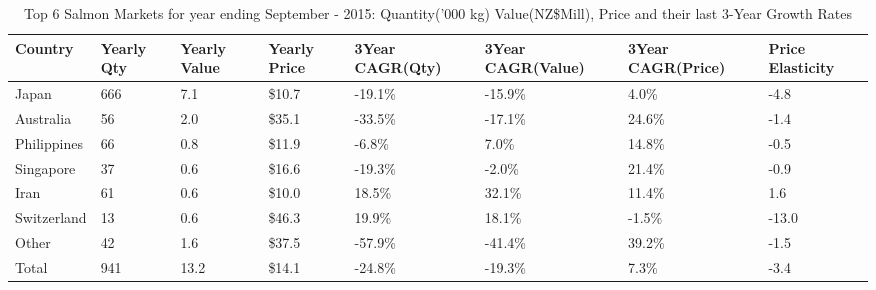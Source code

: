 \begin{table}[ht]
\centering
{\scriptsize
\begin{tabular}[t]{p{1.8cm}>{\hfill}p{1.4cm}>{\hfill}p{1.4cm}>{\hfill}p{1.6cm}>{\hfill}p{1.9cm}>{\hfill}p{2cm}>{\hfill}p{1.9cm}>{\hfill}p{1.5cm}}
 \textbf{Country} & \textbf{Yearly Qty} & \textbf{Yearly Value} & \textbf{Yearly Price} & \textbf{3Year CAGR(Qty)} & \textbf{3Year CAGR(Value)} & \textbf{3Year CAGR(Price)} & \textbf{Price Elasticity} \\
\hline
Japan & 666 & 7.1 & \$10.7 & -19.1\% & -15.9\% & 4.0\% & -4.8 \\  
Australia & 56 & 2.0 & \$35.1 & -33.5\% & -17.1\% & 24.6\% & -1.4 \\  
Philippines & 66 & 0.8 & \$11.9 & -6.8\% & 7.0\% & 14.8\% & -0.5 \\  
Singapore & 37 & 0.6 & \$16.6 & -19.3\% & -2.0\% & 21.4\% & -0.9 \\  
Iran & 61 & 0.6 & \$10.0 & 18.5\% & 32.1\% & 11.4\% & 1.6 \\  
Switzerland & 13 & 0.6 & \$46.3 & 19.9\% & 18.1\% & -1.5\% & -13.0 \\  
Other & 42 & 1.6 & \$37.5 & -57.9\% & -41.4\% & 39.2\% & -1.5 \\  
Total & 941 & 13.2 & \$14.1 & -24.8\% & -19.3\% & 7.3\% & -3.4 \\  
\hline
\end{tabular}
}
\caption{\scriptsize Top 6 Salmon Markets for year ending September - 2015: Quantity('000 kg) Value(NZ\$Mill), Price and their last 3-Year Growth Rates}
\end{table}

